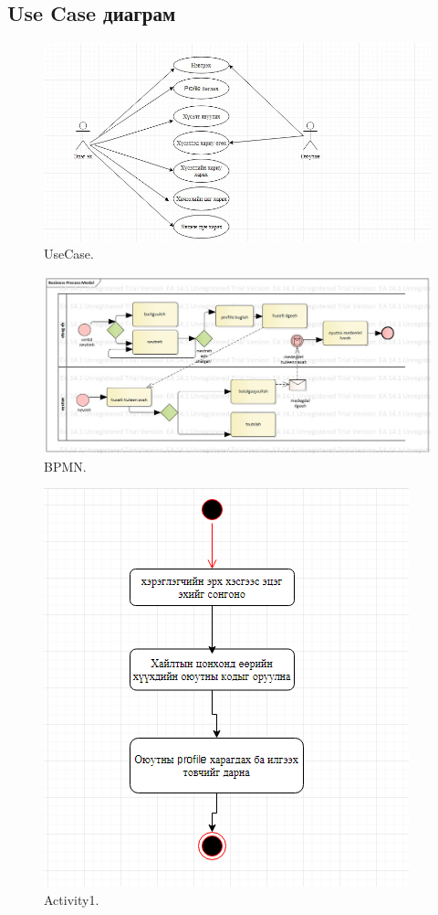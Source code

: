 \documentclass[12pt]{article}
\begin{document}
\subsection{Use Case диаграм}
\begin{figure}
	\caption{UseCase.}
	\label{fig:usecase}
	\includegraphics[width=\linewidth]{usecase.jpg}
\end{figure}
\begin{figure}
	\caption{BPMN.}
	\label{fig:bpmn1}
	\includegraphics[width=\linewidth]{bpmn.jpg}
\end{figure}
\begin{figure}
	\caption{Activity1.}
	\label{fig:a1}
	\includegraphics[width=\linewidth]{A1.png}
\end{figure}
\end{document}
